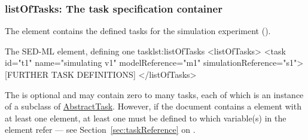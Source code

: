  \subsubsection{listOfTasks: The task specification container}
\label{sec:listOfTasks}
The  element contains the defined tasks for the simulation experiment ().
%
%

%
\begin{myXmlLst}{The SED-ML  element, defining one task}{lst:listOfTasks}
<listOfTasks>
 <task id="t1" name="simulating v1" modelReference="m1" simulationReference="s1">
 [FURTHER TASK DEFINITIONS]
</listOfTasks>
\end{myXmlLst}
The  is optional and may contain zero to many tasks, each of which is an instance of a subclass of \hyperref[class:abstractTask]{AbstractTask}.
However, if the \LoneVtwo document contains a  element with at least one  element, at least one  must be defined to which variable(s) in the  element refer --- see Section~\ref{sec:taskReference} on .

